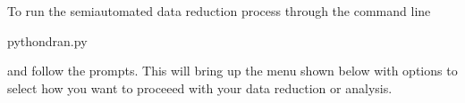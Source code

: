 \documentclass[letterpaper,10pt,english]{sphinxmanual}
\begin{document}
\sphinxAtStartPar
To run the semi\sphinxhyphen{}automated data reduction process through the
command line

\begin{sphinxVerbatim}[commandchars=\\\{\}]
\PYGZdl{}pythondran.py
\end{sphinxVerbatim}

\sphinxAtStartPar
and follow the prompts. This will bring up the menu shown below
with options to select how you want to proceeed with your data
reduction or analysis.

\begin{sphinxVerbatim}[commandchars=\\\{\},numbers=left,firstnumber=1,stepnumber=1]
\PYGZsh{}\PYGZsh{}\PYGZsh{}\PYGZsh{}\PYGZsh{}\PYGZsh{}\PYGZsh{}\PYGZsh{}\PYGZsh{}\PYGZsh{}\PYGZsh{}\PYGZsh{}\PYGZsh{}\PYGZsh{}\PYGZsh{}\PYGZsh{}\PYGZsh{}\PYGZsh{}\PYGZsh{}\PYGZsh{}\PYGZsh{}\PYGZsh{}\PYGZsh{}\PYGZsh{}\PYGZsh{}\PYGZsh{}\PYGZsh{}\PYGZsh{}\PYGZsh{}\PYGZsh{}\PYGZsh{}\PYGZsh{}\PYGZsh{}\PYGZsh{}\PYGZsh{}\PYGZsh{}\PYGZsh{}\PYGZsh{}\PYGZsh{}\PYGZsh{}\PYGZsh{}\PYGZsh{}\PYGZsh{}\PYGZsh{}\PYGZsh{}\PYGZsh{}\PYGZsh{}\PYGZsh{}\PYGZsh{}\PYGZsh{}\PYGZsh{}\PYGZsh{}\PYGZsh{}\PYGZsh{}\PYGZsh{}\PYGZsh{}\PYGZsh{}\PYGZsh{}\PYGZsh{}\PYGZsh{}\PYGZsh{}\PYGZsh{}\PYGZsh{}\PYGZsh{}\PYGZsh{}\PYGZsh{}
\PYGZsh{}                                                                                              \PYGZsh{}
\PYGZsh{}              \PYGZsh{}\PYGZsh{}\PYGZsh{}\PYGZsh{}\PYGZsh{}\PYGZsh{}  \PYGZsh{}\PYGZsh{}\PYGZsh{}\PYGZsh{}\PYGZsh{}\PYGZsh{}  \PYGZsh{}\PYGZsh{}\PYGZsh{}\PYGZsh{}\PYGZsh{}\PYGZsh{} \PYGZsh{}    \PYGZsh{}                                   \PYGZsh{}
\PYGZsh{}              \PYGZsh{}     \PYGZsh{} \PYGZsh{}    \PYGZsh{}  \PYGZsh{}    \PYGZsh{} \PYGZsh{} \PYGZsh{}  \PYGZsh{}                                   \PYGZsh{}
\PYGZsh{}              \PYGZsh{}     \PYGZsh{} \PYGZsh{}\PYGZsh{}\PYGZsh{}\PYGZsh{}\PYGZsh{}   \PYGZsh{}\PYGZsh{}\PYGZsh{}\PYGZsh{}\PYGZsh{}\PYGZsh{} \PYGZsh{}  \PYGZsh{} \PYGZsh{}                                   \PYGZsh{}
\PYGZsh{}              \PYGZsh{}     \PYGZsh{} \PYGZsh{}    \PYGZsh{}  \PYGZsh{}    \PYGZsh{} \PYGZsh{}   \PYGZsh{}\PYGZsh{}                                   \PYGZsh{}
\PYGZsh{}              \PYGZsh{}\PYGZsh{}\PYGZsh{}\PYGZsh{}\PYGZsh{}\PYGZsh{}  \PYGZsh{}    \PYGZsh{}  \PYGZsh{}    \PYGZsh{} \PYGZsh{}    \PYGZsh{}                                   \PYGZsh{}
\PYGZsh{}                                                                                              \PYGZsh{}
\PYGZsh{}\PYGZsh{}\PYGZsh{}\PYGZsh{}\PYGZsh{}\PYGZsh{}\PYGZsh{}\PYGZsh{}\PYGZsh{}\PYGZsh{}\PYGZsh{}\PYGZsh{}\PYGZsh{}\PYGZsh{}\PYGZsh{}\PYGZsh{}\PYGZsh{}\PYGZsh{}\PYGZsh{}\PYGZsh{}\PYGZsh{}\PYGZsh{}\PYGZsh{}\PYGZsh{}\PYGZsh{}\PYGZsh{}\PYGZsh{}\PYGZsh{}\PYGZsh{}\PYGZsh{}\PYGZsh{}\PYGZsh{}\PYGZsh{}\PYGZsh{}\PYGZsh{}\PYGZsh{}\PYGZsh{}\PYGZsh{}\PYGZsh{}\PYGZsh{}\PYGZsh{}\PYGZsh{}\PYGZsh{}\PYGZsh{}\PYGZsh{}\PYGZsh{}\PYGZsh{}\PYGZsh{}\PYGZsh{}\PYGZsh{}\PYGZsh{}\PYGZsh{}\PYGZsh{}\PYGZsh{}\PYGZsh{}\PYGZsh{}\PYGZsh{}\PYGZsh{}\PYGZsh{}\PYGZsh{}\PYGZsh{}\PYGZsh{}\PYGZsh{}\PYGZsh{}\PYGZsh{}\PYGZsh{}


\end{sphinxVerbatim}
\end{document}
